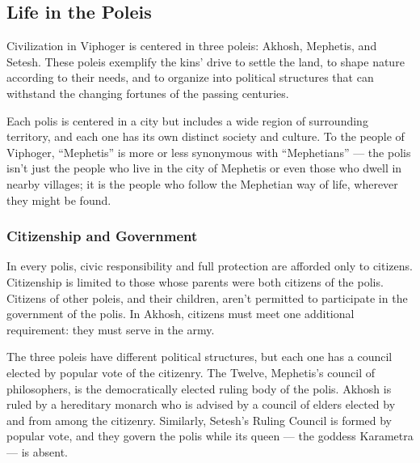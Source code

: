 \subsection*{Life in the Poleis} \label{ssec::lifeinthepoleis}
Civilization in Viphoger is centered in three poleis: Akhosh, Mephetis, and Setesh.
These poleis exemplify the kins' drive to settle the land, to shape nature according to their needs, and to organize into political structures that can withstand the changing fortunes of the passing centuries.

Each polis is centered in a city but includes a wide region of surrounding territory, and each one has its own distinct society and culture.
To the people of Viphoger, ``Mephetis'' is more or less synonymous with ``Mephetians'' --- the polis isn't just the people who live in the city of Mephetis or even those who dwell in nearby villages; it is the people who follow the Mephetian way of life, wherever they might be found.


\subsubsection{Citizenship and Government}
In every polis, civic responsibility and full protection are afforded only to citizens.
Citizenship is limited to those whose parents were both citizens of the polis.
Citizens of other poleis, and their children, aren't permitted to participate in the government of the polis.
In Akhosh, citizens must meet one additional requirement: they must serve in the army.

The three poleis have different political structures, but each one has a council elected by popular vote of the citizenry.
The Twelve, Mephetis's council of philosophers, is the democratically elected ruling body of the polis.
Akhosh is ruled by a hereditary monarch who is advised by a council of elders elected by and from among the citizenry.
Similarly, Setesh's Ruling Council is formed by popular vote, and they govern the polis while its queen --- the goddess Karametra --- is absent.

